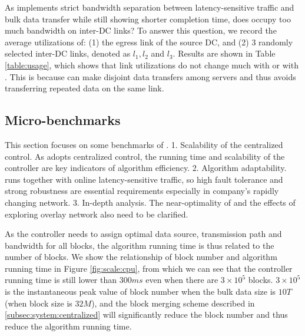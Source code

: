 


As \name implements strict bandwidth separation between latency-sensitive traffic and bulk data transfer while still showing shorter completion time, does \name occupy too much bandwidth on inter-DC links? To answer this question, we record the average utilizations of: (1) the egress link of the source DC, and (2) 3 randomly selected inter-DC links, denoted as $l_1,l_2$ and $l_3$. Results are shown in Table \ref{table:usage}, which shows that link utilizations do not change much with \name or with \company. This is because \name can make disjoint data transfers among servers and thus avoids transferring repeated data on the same link.


\subsection{Micro-benchmarks}
\label{subsec:evaluation:benchmarks}

This section focuses on some benchmarks of \name. 1. Scalability of the centralized control. As \name adopts centralized control, the running time and scalability of the controller are key indicators of algorithm efficiency. 2. Algorithm adaptability. \name runs together with online latency-sensitive traffic, so high fault tolerance and strong robustness are essential requirements especially in company's rapidly changing network. 3. In-depth analysis. The near-optimality of \name and the effects of exploring overlay network also need to be clarified.

\label{subsec:evaluation:benchmarks:scalability}

 As the controller needs to assign optimal data source, transmission path and bandwidth for all blocks, the algorithm running time is thus related to the number of blocks. We show the relationship of block number and algorithm running time in Figure \ref{fig:scale:cpu}, from which we can see that the controller running time is still lower than $300ms$ even when there are $3\times 10^5$ blocks. $3\times 10^5$ is the instantaneous peak value of block number when the bulk data size is $10T$ (when block size is $32M$), and the block merging scheme described in \Section\ref{subsec:system:centralized} will significantly reduce the block number and thus reduce the algorithm running time.

